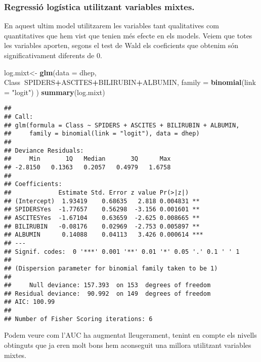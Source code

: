 \documentclass[]{article}
\newenvironment{Shaded}{\begin{snugshade}}{\end{snugshade}}
\newcommand{\DataTypeTok}[1]{\textcolor[rgb]{0.13,0.29,0.53}{#1}}
\newcommand{\KeywordTok}[1]{\textcolor[rgb]{0.13,0.29,0.53}{\textbf{#1}}}
\newcommand{\NormalTok}[1]{#1}
\newcommand{\OperatorTok}[1]{\textcolor[rgb]{0.81,0.36,0.00}{\textbf{#1}}}
\newcommand{\StringTok}[1]{\textcolor[rgb]{0.31,0.60,0.02}{#1}}
\begin{document}
\hypertarget{regressiuxf3-loguxedstica-utilitzant-variables-mixtes.}{%
\subsubsection{Regressió logística utilitzant variables
mixtes.}\label{regressiuxf3-loguxedstica-utilitzant-variables-mixtes.}}

En aquest ultim model utilitzarem les variables tant qualitatives com
quantitatives que hem vist que tenien més efecte en els models. Veiem
que totes les variables aporten, segons el test de Wald els coeficients
que obtenim són significativament diferents de 0.

\begin{Shaded}
\begin{Highlighting}[]
\NormalTok{log.mixt<-}\StringTok{ }\KeywordTok{glm}\NormalTok{(}\DataTypeTok{data =}\NormalTok{ dhep, Class}\OperatorTok{~}\NormalTok{SPIDERS}\OperatorTok{+}\NormalTok{ASCITES}\OperatorTok{+}\NormalTok{BILIRUBIN}\OperatorTok{+}\NormalTok{ALBUMIN,}
                 \DataTypeTok{family =} \KeywordTok{binomial}\NormalTok{(}\DataTypeTok{link =} \StringTok{"logit"}\NormalTok{) )}
\KeywordTok{summary}\NormalTok{(log.mixt)}
\end{Highlighting}
\end{Shaded}

\begin{verbatim}
## 
## Call:
## glm(formula = Class ~ SPIDERS + ASCITES + BILIRUBIN + ALBUMIN, 
##     family = binomial(link = "logit"), data = dhep)
## 
## Deviance Residuals: 
##     Min       1Q   Median       3Q      Max  
## -2.8150   0.1363   0.2057   0.4979   1.6758  
## 
## Coefficients:
##             Estimate Std. Error z value Pr(>|z|)    
## (Intercept)  1.93419    0.68635   2.818 0.004831 ** 
## SPIDERSYes  -1.77657    0.56298  -3.156 0.001601 ** 
## ASCITESYes  -1.67104    0.63659  -2.625 0.008665 ** 
## BILIRUBIN   -0.08176    0.02969  -2.753 0.005897 ** 
## ALBUMIN      0.14088    0.04113   3.426 0.000614 ***
## ---
## Signif. codes:  0 '***' 0.001 '**' 0.01 '*' 0.05 '.' 0.1 ' ' 1
## 
## (Dispersion parameter for binomial family taken to be 1)
## 
##     Null deviance: 157.393  on 153  degrees of freedom
## Residual deviance:  90.992  on 149  degrees of freedom
## AIC: 100.99
## 
## Number of Fisher Scoring iterations: 6
\end{verbatim}

Podem veure com l'AUC ha augmentat lleugerament, tenint en compte els
nivells obtinguts que ja eren molt bons hem aconseguit una millora
utilitzant variables mixtes.
\end{document}
